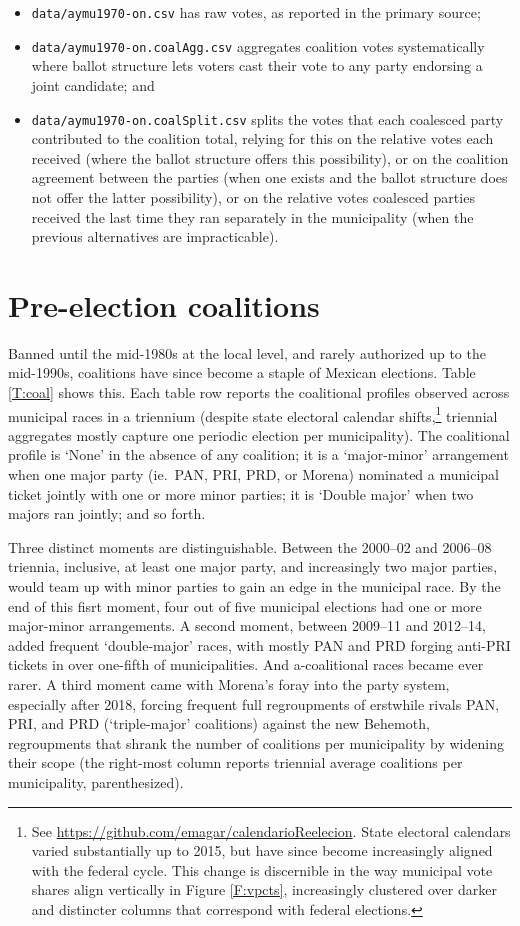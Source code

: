 \documentclass[letter,12pt]{article}
\begin{document}
\begin{itemize}
\item \verb|data/aymu1970-on.csv| has raw votes, as reported in the primary source; 
\item \verb|data/aymu1970-on.coalAgg.csv| aggregates coalition votes systematically where ballot structure lets voters cast their vote to any party endorsing a joint candidate; and
\item \verb|data/aymu1970-on.coalSplit.csv| splits the votes that each coalesced party contributed to the coalition total, relying for this on the relative votes each received (where the ballot structure offers this possibility), or on the coalition agreement between the parties (when one exists and the ballot structure does not offer the latter possibility), or on the relative votes coalesced parties received the last time they ran separately in the municipality (when the previous alternatives are impracticable).  
\end{itemize}

\section{Pre-election coalitions}
Banned until the mid-1980s at the local level, and rarely authorized up to the mid-1990s, coalitions have since become a staple of Mexican elections. Table \ref{T:coal} shows this. Each table row reports the coalitional profiles observed across municipal races in a triennium (despite state electoral calendar shifts,\footnote{See \url{https://github.com/emagar/calendarioReelecion}. State electoral calendars varied substantially up to 2015, but have since become increasingly aligned with the federal cycle. This change is discernible in the way municipal vote shares align vertically in Figure \ref{F:vpcts}, increasingly clustered over darker and distincter columns that correspond with federal elections.} triennial aggregates mostly capture one periodic election per municipality). The coalitional profile is `None' in the absence of any coalition; it is a `major-minor' arrangement when one major party (ie.\ PAN, PRI, PRD, or Morena) nominated a municipal ticket jointly with one or more minor parties; it is `Double major' when two majors ran jointly; and so forth.

Three distinct moments are distinguishable. Between the 2000--02 and 2006--08 triennia, inclusive, at least one major party, and increasingly two major parties, would team up with minor parties to gain an edge in the municipal race. By the end of this fisrt moment, four out of five municipal elections had one or more major-minor arrangements. A second moment, between 2009--11 and 2012--14, added frequent `double-major' races, with mostly PAN and PRD forging anti-PRI tickets in over one-fifth of municipalities. And a-coalitional races became ever rarer. A third moment came with Morena's foray into the party system, especially after 2018, forcing frequent full regroupments of erstwhile rivals PAN, PRI, and PRD (`triple-major' coalitions) against the new Behemoth, regroupments that shrank the number of coalitions per municipality by widening their scope (the right-most column reports triennial average coalitions per municipality, parenthesized).
\end{document}
